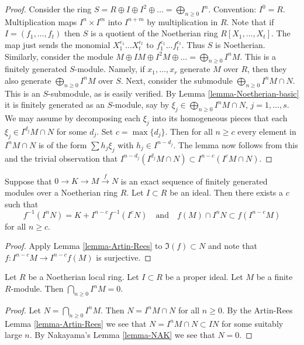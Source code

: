 \begin{proof}
Consider the ring $S = R \oplus I \oplus I^2 \oplus \ldots
= \bigoplus_{n \geq 0} I^n$. Convention: $I^0 = R$.
Multiplication maps $I^n \times I^m$
into $I^{n + m}$ by multiplication in $R$.
Note that if $I = (f_1, \ldots, f_t)$
then $S$ is a quotient of the Noetherian ring $R[X_1, \ldots, X_t]$.
The map just sends the monomial $X_1^{e_1}\ldots X_t^{e_t}$
to $f_1^{e_1}\ldots f_t^{e_t}$. Thus $S$ is Noetherian.
Similarly, consider the module $M \oplus IM \oplus I^2M \oplus \ldots
= \bigoplus_{n \geq 0} I^nM$. This is a finitely generated $S$-module.
Namely, if $x_1, \ldots, x_r$ generate $M$ over $R$, then they also generate
$\bigoplus_{n \geq 0} I^nM$ over $S$. Next, consider the
submodule $\bigoplus_{n \geq 0} I^nM \cap N$.
This is an $S$-submodule, as is easily verified. By
Lemma \ref{lemma-Noetherian-basic} it is finitely generated as
an $S$-module,
say by $\xi_j \in \bigoplus_{n \geq 0} I^nM \cap N$, $j = 1, \ldots, s$.
We may assume by decomposing each $\xi_j$ into its homogeneous
pieces that each $\xi_j \in I^{d_j}M \cap N$ for some $d_j$.
Set $c = \max\{d_j\}$. Then for all $n \geq c$ every element
in $I^nM \cap N$ is of the form $\sum h_j \xi_j$ with
$h_j \in I^{n - d_j}$. The lemma now follows from this and the trivial
observation that $I^{n-d_j}(I^{d_j}M \cap N) \subset I^{n-c}(I^cM \cap N)$.
\end{proof}

\begin{lemma}
\label{lemma-map-AR}
Suppose that $0 \to K \to M \xrightarrow{f} N$ is an
exact sequence of finitely generated modules
over a Noetherian ring $R$. Let $I \subset R$ be an ideal.
Then there exists a $c$ such that
$$
f^{-1}(I^nN) = K + I^{n-c}f^{-1}(I^cN)
\quad\text{and}\quad
f(M) \cap I^nN \subset f(I^{n - c}M)
$$
for all $n \geq c$.
\end{lemma}

\begin{proof}
Apply Lemma \ref{lemma-Artin-Rees} to
$\Im(f) \subset N$ and note that
$f : I^{n-c}M \to I^{n-c}f(M)$ is surjective.
\end{proof}

\begin{lemma}
\label{lemma-intersect-powers-ideal-module-zero}
Let $R$ be a Noetherian local ring. Let $I \subset R$ be
a proper ideal. Let $M$ be a finite $R$-module.
Then $\bigcap_{n \geq 0} I^nM = 0$.
\end{lemma}

\begin{proof}
Let $N = \bigcap_{n \geq 0} I^nM$.
Then $N = I^nM \cap N$ for all $n \geq 0$.
By the Artin-Rees Lemma \ref{lemma-Artin-Rees}
we see that $N = I^nM \cap N \subset IN$ for
some suitably large $n$. By Nakayama's Lemma \ref{lemma-NAK}
we see that $N = 0$.
\end{proof}


